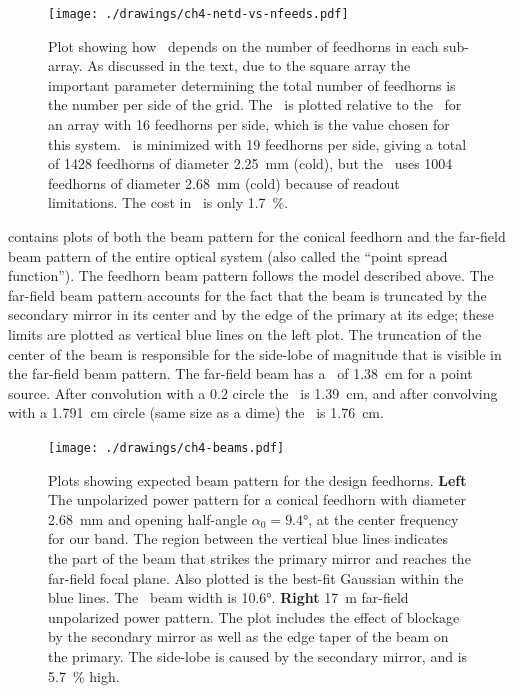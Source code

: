 \begin{figure}
\centering
\texttt{[image: ./drawings/ch4-netd-vs-nfeeds.pdf]}
\caption[\NETD\ vs number of detectors]{
  Plot showing how \NETD\ depends on the number of feedhorns in each sub-array.
  As discussed in the text, due to the square array the important parameter determining the total number of feedhorns is the number per side of the grid.
  The \NETD\ is plotted relative to the \NETD\ for an array with 16 feedhorns per side, which is the value chosen for this system.
  \NETD\ is minimized with 19 feedhorns per side, giving a total of 1428 feedhorns of diameter \SI{2.25}{\mm} (cold), but the \Imager\ uses 1004 feedhorns of diameter \SI{2.68}{\mm} (cold) because of readout limitations.
  The cost in \NETD\ is only \SI{1.7}{\percent}.
}
\label{fig:ch4-netd-vs-nfeeds}
\end{figure}


 contains plots of both the beam pattern for the conical feedhorn and the far-field beam pattern of the entire optical system (also called the ``point spread function'').
The feedhorn beam pattern follows the model described above.
The far-field beam pattern accounts for the fact that the beam is truncated by the secondary mirror in its center and by the edge of the primary at its edge; these limits are plotted as vertical blue lines on the left plot.
The truncation of the center of the beam is responsible for the side-lobe of magnitude  that is visible in the far-field beam pattern.
The far-field beam has a \FWHM\ of \SI{1.38}{\cm} for a point source.
After convolution with a \SI{0.2}{\in} circle the \FWHM\ is \SI{1.39}{\cm}, and after convolving with a \SI{1.791}{\cm} circle (same size as a dime) the \FWHM\ is \SI{1.76}{\cm}.

\begin{figure}
\centering
\texttt{[image: ./drawings/ch4-beams.pdf]}
\caption[Beam patterns]{
  Plots showing expected beam pattern for the design feedhorns.
  \textbf{Left} The unpolarized power pattern for a conical feedhorn with diameter \SI{2.68}{\mm} and opening half-angle $\alpha_0 = \ang{9.4}$, at the center frequency for our band.
  The region between the vertical blue lines indicates the part of the beam that strikes the primary mirror and reaches the far-field focal plane.
  Also plotted is the best-fit Gaussian within the blue lines.
  The \FWHM\ beam width is \ang{10.6}.
  \textbf{Right} \SI{17}{\m} far-field unpolarized power pattern.
  The plot includes the effect of blockage by the secondary mirror as well as the edge taper of the beam on the primary.
  The side-lobe is caused by the secondary mirror, and is \SI{5.7}{\percent} high.
}
\label{fig:ch4-beams}
\end{figure}

